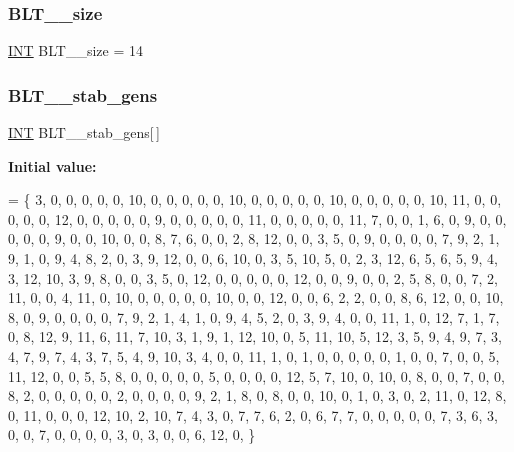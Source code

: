 \subsubsection{\texorpdfstring{B\+L\+T\+\_\+\_\+size}{BLT\_13\_size}}
{\footnotesize\ttfamily \mbox{\hyperlink{galois_8h_a09fddde158a3a20bd2dcadb609de11dc}{I\+NT}} B\+L\+T\+\_\+\_\+size = 14}

\mbox{\label{data___b_l_t_8_c_a88cef730c30eb29251395a9291f6645a}} 
\subsubsection{\texorpdfstring{B\+L\+T\+\_\+\_\+stab\+\_\+gens}{BLT\_13\_stab\_gens}}
{\footnotesize\ttfamily \mbox{\hyperlink{galois_8h_a09fddde158a3a20bd2dcadb609de11dc}{I\+NT}} B\+L\+T\+\_\+\_\+stab\+\_\+gens\mbox{[}$\,$\mbox{]}}

{\bfseries Initial value\+:}
\begin{DoxyCode}
= \{
 3,  0,  0,  0,  0,  0, 10,  0,  0,  0,  0,  0, 10,  0,  0,  0,  0,  0, 10,  0,  0,  0,  0,  0, 10, 
11,  0,  0,  0,  0,  0, 12,  0,  0,  0,  0,  0,  9,  0,  0,  0,  0,  0, 11,  0,  0,  0,  0,  0, 11, 
 7,  0,  0,  1,  6,  0,  9,  0,  0,  0,  0,  0,  9,  0,  0, 10,  0,  0,  8,  7,  6,  0,  0,  2,  8, 
12,  0,  0,  3,  5,  0,  9,  0,  0,  0,  0,  7,  9,  2,  1,  9,  1,  0,  9,  4,  8,  2,  0,  3,  9, 
12,  0,  0,  6, 10,  0,  3,  5, 10,  5,  0,  2,  3, 12,  6,  5,  6,  5,  9,  4,  3, 12, 10,  3,  9, 
 8,  0,  0,  3,  5,  0, 12,  0,  0,  0,  0,  0, 12,  0,  0,  9,  0,  0,  2,  5,  8,  0,  0,  7,  2, 
11,  0,  0,  4, 11,  0, 10,  0,  0,  0,  0,  0, 10,  0,  0, 12,  0,  0,  6,  2,  2,  0,  0,  8,  6, 
12,  0,  0, 10,  8,  0,  9,  0,  0,  0,  0,  7,  9,  2,  1,  4,  1,  0,  9,  4,  5,  2,  0,  3,  9, 
 4,  0,  0, 11,  1,  0, 12,  7,  1,  7,  0,  8, 12,  9, 11,  6, 11,  7, 10,  3,  1,  9,  1, 12, 10, 
 0,  5, 11, 10,  5, 12,  3,  5,  9,  4,  9,  7,  3,  4,  7,  9,  7,  4,  3,  7,  5,  4,  9, 10,  3, 
 4,  0,  0, 11,  1,  0,  1,  0,  0,  0,  0,  0,  1,  0,  0,  7,  0,  0,  5, 11, 12,  0,  0,  5,  5, 
 8,  0,  0,  0,  0,  0,  5,  0,  0,  0,  0, 12,  5,  7, 10,  0, 10,  0,  8,  0,  0,  7,  0,  0,  8, 
 2,  0,  0,  0,  0,  0,  2,  0,  0,  0,  0,  9,  2,  1,  8,  0,  8,  0,  0, 10,  0,  1,  0,  3,  0, 
 2, 11,  0, 12,  8,  0, 11,  0,  0,  0, 12, 10,  2, 10,  7,  4,  3,  0,  7,  7,  6,  2,  0,  6,  7, 
 7,  0,  0,  0,  0,  0,  7,  3,  6,  3,  0,  0,  7,  0,  0,  0,  0,  3,  0,  3,  0,  0,  6, 12,  0, 
\}
\end{DoxyCode}
\mbox{\label{data___b_l_t_8_c_a62f1218959bc4f348152801def2b5bde}} 
